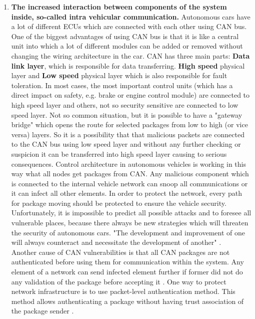 \begin{enumerate}
	\item \textbf{The increased interaction between components of the system inside, so-called intra vehicular communication.} Autonomous cars have a lot of different \glspl{ECU} which are connected with each other using \gls{CAN} bus. One of the biggest advantages of using \gls{CAN} bus is that it is like a central unit into which a lot of different modules can be added or removed without changing the wiring architecture in the car. \gls{CAN} has three main parts:  \textbf{Data link layer}, which is responsible for data transferring. \textbf{High speed} physical layer and \textbf{Low speed} physical layer which is also responsible for fault toleration. In most cases, the most important control units (which has a direct impact on safety, e.g. brake or engine control module) are connected to high speed layer and others, not so security sensitive are connected to low speed layer. Not so common situation, but it is possible to have a "gateway bridge" which opens the route for selected packages from low to high (or vice versa) layers. So it is a possibility that that malicious packets are connected to the \gls{CAN} bus using low speed layer and without any further checking or suspicion it can be transferred into high speed layer causing to serious consequences. Control architecture in autonomous vehicles is working in this way what all nodes get packages from \gls{CAN}. Any malicious component which is connected to the internal vehicle network can snoop all communications or it can infect all other elements. In order to protect the network, every path for package moving should be protected to ensure the vehicle security. Unfortunately, it is impossible to predict all possible attacks and to foresee all vulnerable places, because there always be new strategies which will threaten the security of autonomous cars. "The development and improvement of one will always counteract and necessitate the development of another" \cite{sec}. \\
	
	Another cause of \gls{CAN} vulnerabilities is that all \gls{CAN} packages are not authenticated before using them for communication within the system. Any element of a network can send infected element further if former did not do any validation of the package before accepting it \cite{secanalysis}.
	One way to protect network infrastructure is to use packet-level authentication method. This method allows authenticating a package without having trust association of the package sender \cite{pla}.
\end{enumerate}

